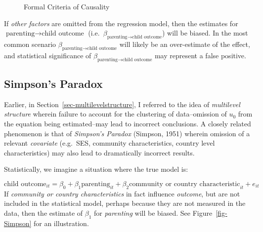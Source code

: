 \documentclass[
  letterpaper,
  DIV=11,
  numbers=noendperiod]{scrreprt}
\begin{document}
\begin{figure}

{\centering 

}

\caption{\label{fig-causalitysubstantive}Formal Criteria of Causality}

\end{figure}

If \emph{other factors} are omitted from the regression model, then the
estimates for \(\text{parenting} \rightarrow \text{child outcome}\)
(i.e.~\(\beta_{\text{parenting} \rightarrow \text{child outcome}}\))
will be biased. In the most common scenario
\(\beta_{\text{parenting} \rightarrow \text{child outcome}}\) will
likely be an over-estimate of the effect, and statistical significance
of \(\beta_{\text{parenting} \rightarrow \text{child outcome}}\) may
represent a false positive.

\hypertarget{simpsons-paradox}{%
\subsection{Simpson's Paradox}\label{simpsons-paradox}}

Earlier, in Section~\ref{sec-multilevelstructure}, I referred to the
idea of \emph{multilevel structure} wherein failure to account for the
clustering of data--omission of \(u_0\) from the equation being
estimated--may lead to incorrect conclusions. A closely related
phenomenon is that of \emph{Simpson's Paradox} (Simpson, 1951) wherein
omission of a relevant \emph{covariate} (e.g.~SES, community
characteristics, country level characteristics) may also lead to
dramatically incorrect results.

Statistically, we imagine a situation where the true model is:

\[\text{child outcome}_{it} = \beta_0 + \beta_1 \text{parenting}_{it} + \beta_2 \text{community or country characteristic}_{it} + e_{it}\]
If \emph{community or country characteristics} in fact influence
\emph{outcome}, but are not included in the statistical model, perhaps
because they are not measured in the data, then the estimate of
\(\beta_1\) for \emph{parenting} will be biased. See
Figure~\ref{fig-Simpson} for an illustration.
\end{document}
